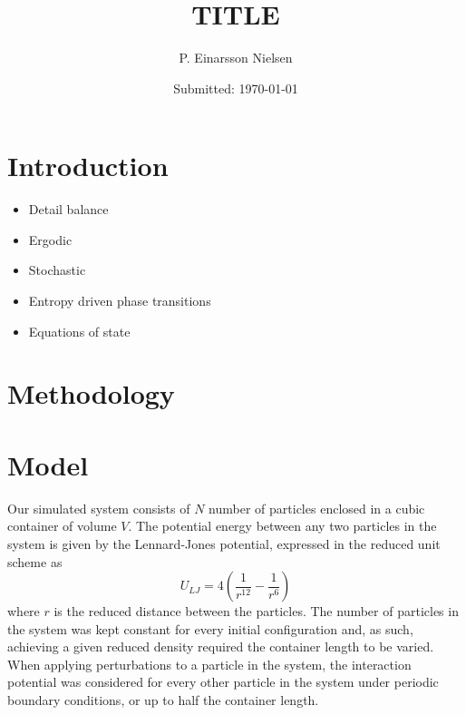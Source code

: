 \documentclass[10pt, twocolumn]{revtex4}    %
\begin{document}
                     


\title{TITLE} 
\date{Submitted: \today{}}
\author{P. Einarsson Nielsen}

\begin{abstract}
	\lipsum[1]

\end{abstract}

\maketitle
\thispagestyle{plain} %



\section{Introduction} \label{s:intro}

\begin{itemize}
	\item Detail balance
	\item Ergodic
	\item Stochastic
	\item Entropy driven phase transitions
	\item Equations of state
	
\end{itemize}




\section{Methodology} \label{s:methods}

\section{Model} \label{s:model}
Our simulated system consists of $N$ number of particles enclosed in a cubic container of volume $V$. The potential energy between any two particles in the system is given by the Lennard-Jones potential, expressed in the reduced unit scheme as
\begin{equation}
U_{LJ} = 4\left(\frac{1}{r^{12}}-\frac{1}{r^{6}}\right)
\end{equation}
where $r$ is the reduced distance between the particles.
The number of particles in the system was kept constant for every initial configuration and, as such, achieving a given reduced density required the container length to be varied. When applying perturbations to a particle in the system, the interaction potential was considered for every other particle in the system under periodic boundary conditions, or up to half the container length.
\end{document}
